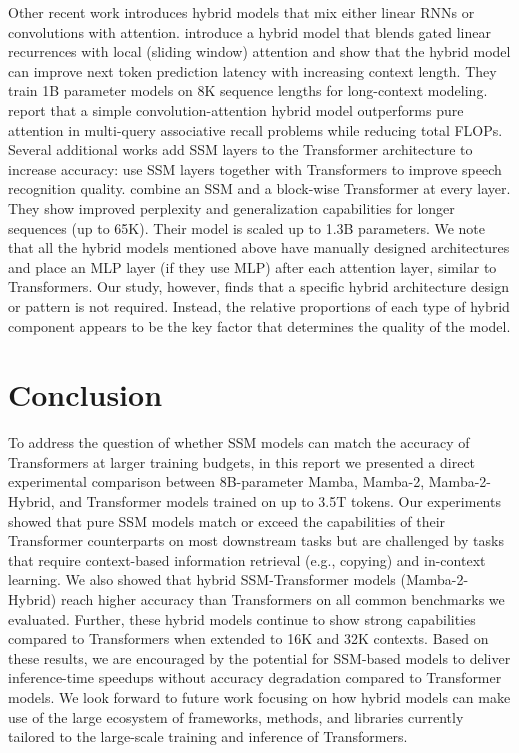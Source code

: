 Other recent work introduces hybrid models that mix either linear RNNs or convolutions with attention. 
\citep{de2024griffin} introduce a hybrid model that blends gated linear recurrences with local (sliding window) attention and show that the hybrid model can improve next token prediction latency with increasing context length. They train 1B parameter models on 8K sequence lengths for long-context modeling. \citep{arora2023zoology} report that a simple convolution-attention hybrid model outperforms pure attention in multi-query associative recall problems while reducing total FLOPs. Several additional works add SSM layers to the Transformer architecture to increase accuracy: \citep{saon2023diagonal} use SSM layers together with Transformers to improve speech recognition quality. \citep{pilault2024block} combine an SSM and a block-wise Transformer at every layer. They show improved perplexity and generalization capabilities for longer sequences (up to 65K). Their model is scaled up to 1.3B parameters. We note that all the hybrid models mentioned above have manually designed architectures and place an MLP layer (if they use MLP) after each attention layer, similar to Transformers. Our study, however, finds that a specific hybrid architecture design or pattern is not required. Instead, the relative proportions of each type of hybrid component appears to be the key factor that determines the quality of the model.

\section{Conclusion}
To address the question of whether SSM models can match the accuracy of Transformers at larger training budgets, in this report we presented a direct experimental comparison between 8B-parameter Mamba, Mamba-2, Mamba-2-Hybrid, and Transformer models trained on up to 3.5T tokens. Our experiments showed that pure SSM models match or exceed the capabilities of their Transformer counterparts on most downstream tasks but are challenged by tasks that require context-based information retrieval (e.g., copying) and in-context learning. We also showed that hybrid SSM-Transformer models (Mamba-2-Hybrid) reach higher accuracy than Transformers on all common benchmarks we evaluated. Further, these hybrid models continue to show strong capabilities compared to Transformers when extended to 16K and 32K contexts. Based on these results, we are encouraged by the potential for SSM-based models to deliver inference-time speedups without accuracy degradation compared to Transformer models. We look forward to future work focusing on how hybrid models can make use of the large ecosystem of frameworks, methods, and libraries currently tailored to the large-scale training and inference of Transformers. 

\printbibliography


